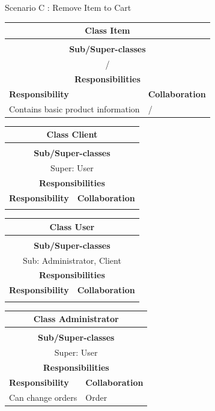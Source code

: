 \documentclass[•]{article}
\begin{document}
\begin{table}
\caption{Scenario C : Remove Item to Cart}
\label{scenarioC}
\end{table}


\begin{table}
\begin{tabular}{|l||l|}
\hline
\multicolumn{2}{|c|}{ Class \textbf{Item} }\\ \hline
\multicolumn{2}{|c|}{}\\ \hline
\multicolumn{2}{|c|}{ \textbf{Sub/Super-classes} }\\ \hline
\multicolumn{2}{|c|}{/} \\ \hline
\multicolumn{2}{|c|}{ \textbf{Responsibilities}}\\ \hline
\textbf{Responsibility} & \textbf{Collaboration} \\ \hline
Contains basic product information & / \\ \hline
\end{tabular}
\begin{tabular}{|l||l|}
\hline
\multicolumn{2}{|c|}{ Class \textbf{Client} }\\ \hline
\multicolumn{2}{|c|}{}\\ \hline
\multicolumn{2}{|c|}{ \textbf{Sub/Super-classes} }\\ \hline
\multicolumn{2}{|c|}{Super: User} \\ \hline
\multicolumn{2}{|c|}{ \textbf{Responsibilities}}\\ \hline
\textbf{Responsibility} & \textbf{Collaboration} \\ \hline
 & \\ \hline
\end{tabular}

\begin{tabular}{|l||l|}
\hline
\multicolumn{2}{|c|}{ Class \textbf{User} }\\ \hline
\multicolumn{2}{|c|}{}\\ \hline
\multicolumn{2}{|c|}{ \textbf{Sub/Super-classes} }\\ \hline
\multicolumn{2}{|c|}{Sub: Administrator, Client} \\ \hline
\multicolumn{2}{|c|}{ \textbf{Responsibilities}}\\ \hline
\textbf{Responsibility} & \textbf{Collaboration} \\ \hline
 &  \\ \hline
\end{tabular}
\begin{tabular}{|l||l|}
\hline
\multicolumn{2}{|c|}{ Class \textbf{Administrator} }\\ \hline
\multicolumn{2}{|c|}{}\\ \hline
\multicolumn{2}{|c|}{ \textbf{Sub/Super-classes} }\\ \hline
\multicolumn{2}{|c|}{Super: User} \\ \hline
\multicolumn{2}{|c|}{ \textbf{Responsibilities}}\\ \hline
\textbf{Responsibility} & \textbf{Collaboration} \\ \hline
Can change orders & Order  \\ \hline
\end{tabular}


\end{table}
\end{document}
